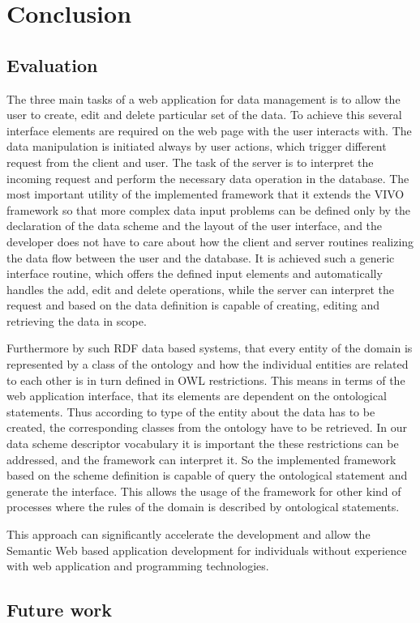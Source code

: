 

\chapter{Conclusion}

\section{Evaluation}

The three main tasks of a web application for data management is to allow the user to create, edit and delete particular set of the data. To achieve this several interface elements are required on the web page with the user interacts with. The data manipulation is initiated always by user actions, which trigger different request from the client and user. The task of the server is to interpret the incoming request and perform the necessary data operation in the database. The most important utility of the implemented framework that it extends the VIVO framework so that more complex data input problems can be defined only by the declaration of the data scheme and the layout of the user interface, and the developer does not have to care about how the client and server routines realizing the data flow between the user and the database. It is achieved such a generic interface routine, which offers the defined input elements and automatically handles the add, edit and delete operations, while the server can interpret the request and based on the data definition is capable of creating, editing and retrieving the data in scope. 

Furthermore by such RDF data based systems, that every entity of the domain is represented by a class of the ontology and how the individual entities are related to each other is in turn defined in OWL restrictions. This means in terms of the web application interface, that its elements are dependent on the ontological statements. Thus according to type of the entity about the data has to be created, the corresponding classes from the ontology have to be retrieved. In our data scheme descriptor vocabulary it is important the these restrictions can be addressed, and the framework can interpret it. So the implemented framework based on the scheme definition is capable of query the ontological statement and generate the interface. This allows the usage of the framework for other kind of processes where the rules of the domain is described by ontological statements.

This approach can significantly accelerate the development and allow the Semantic Web based application development for individuals without experience with web application and programming technologies.


\section{Future work}


